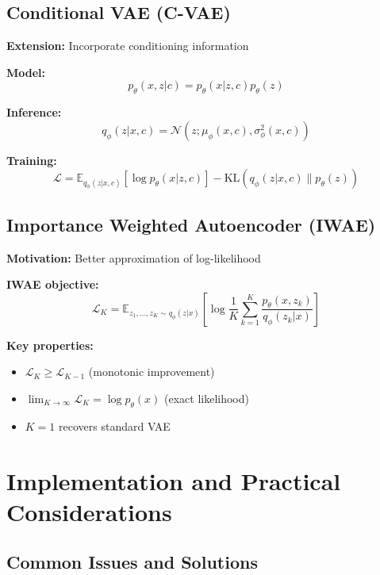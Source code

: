 \subsection{Conditional VAE (C-VAE)}

\textbf{Extension:} Incorporate conditioning information

\textbf{Model:}
\begin{equation}
    p_\theta(x, z|c) = p_\theta(x|z, c) p_\theta(z)
\end{equation}

\textbf{Inference:}
\begin{equation}
    q_\phi(z|x, c) = \mathcal{N}(z; \mu_\phi(x, c), \sigma_\phi^2(x, c))
\end{equation}

\textbf{Training:}
\begin{equation}
    \mathcal{L} = \mathbb{E}_{q_\phi(z|x,c)}[\log p_\theta(x|z,c)] - \text{KL}(q_\phi(z|x,c) \| p_\theta(z))
\end{equation}

\subsection{Importance Weighted Autoencoder (IWAE)}

\textbf{Motivation:} Better approximation of log-likelihood

\textbf{IWAE objective:}
\begin{equation}
    \mathcal{L}_K = \mathbb{E}_{z_1, \ldots, z_K \sim q_\phi(z|x)} \left[ \log \frac{1}{K} \sum_{k=1}^K \frac{p_\theta(x, z_k)}{q_\phi(z_k|x)} \right]
\end{equation}

\textbf{Key properties:}
\begin{itemize}
    \item $\mathcal{L}_K \geq \mathcal{L}_{K-1}$ (monotonic improvement)
    \item $\lim_{K \to \infty} \mathcal{L}_K = \log p_\theta(x)$ (exact likelihood)
    \item $K=1$ recovers standard VAE
\end{itemize}

\section{Implementation and Practical Considerations}

\subsection{Common Issues and Solutions}

